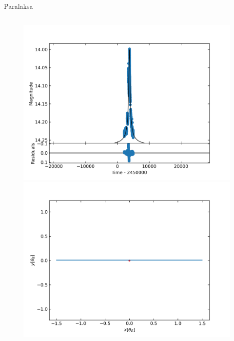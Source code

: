 \documentclass{beamer}
\begin{document}
\begin{frame}{Paralaksa}
    \vspace{-0.3cm}
    \begin{columns}
        \begin{column}{0.45\linewidth}
            \begin{figure}
                \centering
                \includegraphics[width = \textwidth]{../sim30/nothing/png/PAR-01-noaver.dat.png}
                \includegraphics[width = \textwidth]{../sim30/nothing/png/PAR-01-noaver.dat.trj.png}

            \end{figure}
        \end{column}
    

\end{columns}
\end{frame}
\end{document}
